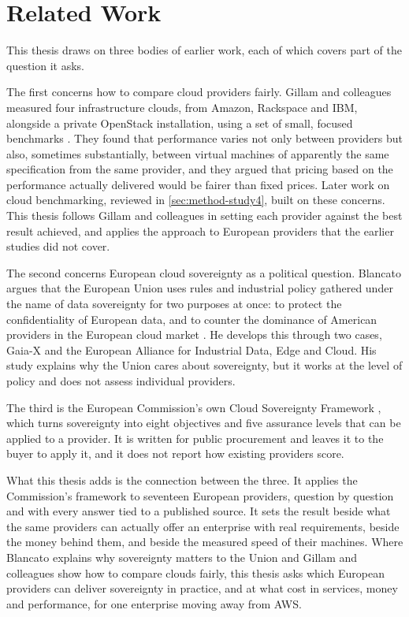 \section{Related Work}
\label{sec:related-work}

This thesis draws on three bodies of earlier work, each of which covers part of
the question it asks.

The first concerns how to compare cloud providers fairly. Gillam and colleagues
measured four infrastructure clouds, from Amazon, Rackspace and IBM, alongside a
private OpenStack installation, using a set of small, focused benchmarks
\cite{Gillam_FairBenchmarking_2013}. They found that performance varies not only
between providers but also, sometimes substantially, between virtual machines of
apparently the same specification from the same provider, and they argued that
pricing based on the performance actually delivered would be fairer than fixed
prices. Later work on cloud benchmarking, reviewed in \cref{sec:method-study4},
built on these concerns. This thesis follows Gillam and colleagues in setting each
provider against the best result achieved, and applies the approach to European
providers that the earlier studies did not cover.

The second concerns European cloud sovereignty as a political question. Blancato
argues that the European Union uses rules and industrial policy gathered under the
name of data sovereignty for two purposes at once: to protect the confidentiality
of European data, and to counter the dominance of American providers in the
European cloud market \cite{Blancato_CloudSovereigntyNexus_2024}. He develops this
through two cases, Gaia-X and the European Alliance for Industrial Data, Edge and
Cloud. His study explains why the Union cares about sovereignty, but it works at
the level of policy and does not assess individual providers.

The third is the European Commission's own Cloud Sovereignty Framework
\cite{EC_DIGIT_CloudSovereignty_2025}, which turns sovereignty into eight
objectives and five assurance levels that can be applied to a provider. It is
written for public procurement and leaves it to the buyer to apply it, and it
does not report how existing providers score.

What this thesis adds is the connection between the three. It applies the
Commission's framework to seventeen European providers, question by question and
with every answer tied to a published source. It sets the result beside what the
same providers can actually offer an enterprise with real requirements, beside
the money behind them, and beside the measured speed of their machines. Where
Blancato explains why sovereignty matters to the Union and Gillam and colleagues
show how to compare clouds fairly, this thesis asks which European providers can
deliver sovereignty in practice, and at what cost in services, money and
performance, for one enterprise moving away from \acs{AWS}.
